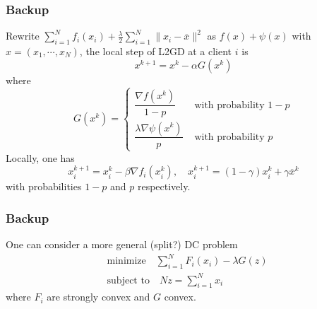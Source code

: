 \begin{frame}
\frametitle{Backup}

Rewrite $\sum\limits_{i=1}^N f_i(x_i) + \frac{\lambda}{2} \sum\limits_{i=1}^N \lVert x_i - \overline{x} \rVert^2$ as $f(x) + \psi(x)$ with $x = (x_1,\cdots,x_N)$, the local step of L2GD at a client $i$ is
$$x^{k+1} = x^k - \alpha G(x^k)$$
where
$$
G(x^k) = \begin{cases}
\dfrac{\nabla f(x^k)}{1-p} & \text{ with probability } 1-p \\
\dfrac{\lambda \nabla \psi(x^k)}{p} & \text{ with probability } p 
\end{cases}
$$
Locally, one has
$$x_i^{k+1} = x_i^k - \beta \nabla f_i(x_i^k), \quad x_i^{k+1} = (1-\gamma)x_i^k + \gamma \overline{x}^k$$
with probabilities $1-p$ and $p$ respectively.

\end{frame}


\begin{frame}
\frametitle{Backup}

One can consider a more general (split?) DC problem
\begin{align*}
    & \text{minimize} \quad \sum\limits_{i=1}^N F_i(x_i) - \lambda G(z) \\
    & \text{subject to} \quad Nz = \sum\limits_{i=1}^N x_i
\end{align*}
where $F_i$ are strongly convex and $G$ convex.

\end{frame}










